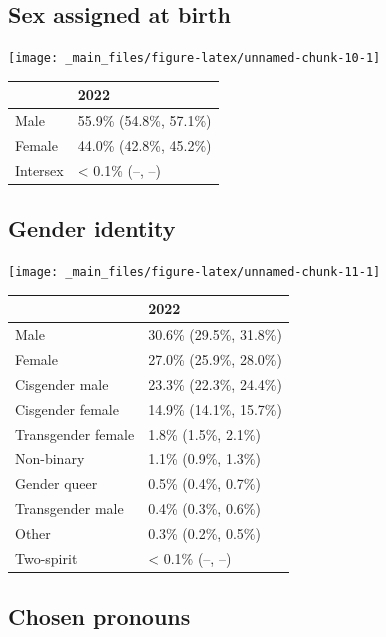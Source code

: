 \documentclass[
]{book}
\begin{document}
\hypertarget{sex-assigned-at-birth}{%
\subsection{Sex assigned at birth}\label{sex-assigned-at-birth}}

\texttt{[image: \_main\_files/figure-latex/unnamed-chunk-10-1]}

\begin{table}
\centering
\begin{tabular}[t]{>{}l|l}
\hline
  & 2022\\
\hline
Male & 55.9\% (54.8\%, 57.1\%)\\
\hline
Female & 44.0\% (42.8\%, 45.2\%)\\
\hline
Intersex & < 0.1\% (--, --)\\
\hline
\end{tabular}
\end{table}

\hypertarget{gender-identity}{%
\subsection{Gender identity}\label{gender-identity}}

\texttt{[image: \_main\_files/figure-latex/unnamed-chunk-11-1]}

\begin{table}
\centering
\begin{tabular}[t]{>{}l|l}
\hline
  & 2022\\
\hline
Male & 30.6\% (29.5\%, 31.8\%)\\
\hline
Female & 27.0\% (25.9\%, 28.0\%)\\
\hline
Cisgender male & 23.3\% (22.3\%, 24.4\%)\\
\hline
Cisgender female & 14.9\% (14.1\%, 15.7\%)\\
\hline
Transgender female & 1.8\% (1.5\%, 2.1\%)\\
\hline
Non-binary & 1.1\% (0.9\%, 1.3\%)\\
\hline
Gender queer & 0.5\% (0.4\%, 0.7\%)\\
\hline
Transgender male & 0.4\% (0.3\%, 0.6\%)\\
\hline
Other & 0.3\% (0.2\%, 0.5\%)\\
\hline
Two-spirit & < 0.1\% (--, --)\\
\hline
\end{tabular}
\end{table}

\hypertarget{chosen-pronouns}{%
\subsection{Chosen pronouns}\label{chosen-pronouns}}
\end{document}
